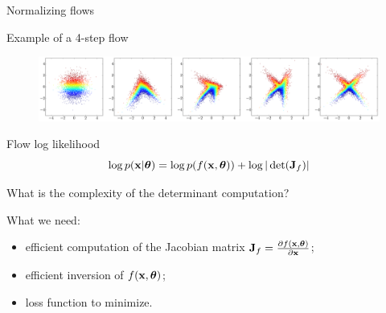 \begin{frame}{Normalizing flows}
	\begin{block}{Example of a 4-step flow}
		\vspace{-0.2cm}
		\begin{figure}
			\includegraphics[width=\linewidth]{figs/flow_4_steps_example.png}
		\end{figure}
	\end{block}
	\vspace{-0.5cm}
	\begin{block}{Flow log likelihood}
		\vspace{-0.3cm}
		\[
		\log p(\mathbf{x}|\boldsymbol{\theta}) = \log p(f(\mathbf{x}, \boldsymbol{\theta})) + \log |\det ( \mathbf{J}_f)|
		\]
		\vspace{-0.3cm}
	\end{block}
	What is the complexity of the determinant computation?
	\begin{block}{What we need:}
		\begin{itemize}
			\item efficient computation of the Jacobian matrix $\mathbf{J}_f = \frac{\partial f(\mathbf{x}, \boldsymbol{\theta})}{\partial \mathbf{x}}$;
			\item efficient inversion of $f(\mathbf{x}, \boldsymbol{\theta})$;
			\item loss function to minimize.
		\end{itemize}
	\end{block}
\end{frame}
